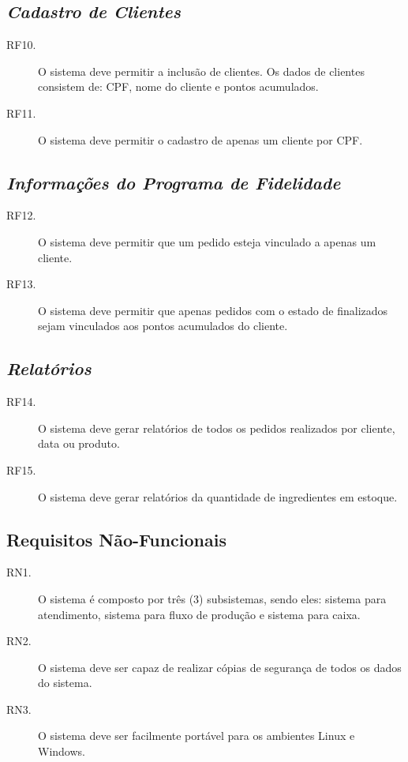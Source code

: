 \documentclass[article, 12pt, oneside, a4paper, brazil]{abntex2}
\begin{document}
 \subsection*{\emph{Cadastro de Clientes}}
 \begin{description}
  \item [RF10.] O sistema deve permitir a inclusão de clientes. Os dados de clientes consistem de: CPF, nome do cliente e pontos acumulados.
  \item [RF11.] O sistema deve permitir o cadastro de apenas um cliente por CPF.
 \end{description}
 
 \subsection*{\emph{Informações do Programa de Fidelidade}}
 \begin{description}
  \item [RF12.] O sistema deve permitir que um pedido esteja vinculado a apenas um cliente.
  \item [RF13.] O sistema deve permitir que apenas pedidos com o estado de finalizados sejam vinculados aos pontos acumulados do cliente.
 \end{description}
 
 \subsection*{\emph{Relatórios}}
 \begin{description}
  \item [RF14.] O sistema deve gerar relatórios de todos os pedidos realizados por cliente, data ou produto.
  \item [RF15.] O sistema deve gerar relatórios da quantidade de ingredientes em estoque.
 \end{description}
 
 \subsection{Requisitos Não-Funcionais}
 \begin{description}
  \item [RN1.] O sistema é composto por três (3) subsistemas, sendo eles: sistema para atendimento, sistema para fluxo de produção e sistema para caixa.
  \item [RN2.] O sistema deve ser capaz de realizar cópias de segurança de todos os dados do sistema.
  \item [RN3.] O sistema deve ser facilmente portável para os ambientes Linux e Windows.
 \end{description}
\end{document}

